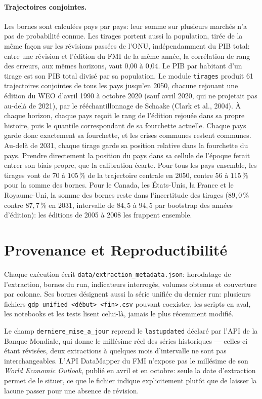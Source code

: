 \documentclass[11pt,a4paper]{article}
\begin{document}
\paragraph{Trajectoires conjointes.} Les bornes sont calculées pays par pays: leur somme sur plusieurs marchés n'a pas de probabilité connue. Les tirages portent aussi la population, tirée de la même façon sur les révisions passées de l'ONU, indépendamment du PIB total: entre une révision et l'édition du FMI de la même année, la corrélation de rang des erreurs, aux mêmes horizons, vaut 0,00 à 0,04. Le PIB par habitant d'un tirage est son PIB total divisé par sa population. Le module \texttt{tirages} produit 61 trajectoires conjointes de tous les pays jusqu'en 2050, chacune rejouant une édition du WEO d'avril 1990 à octobre 2020 (sauf avril 2020, qui ne projetait pas au-delà de 2021), par le rééchantillonnage de Schaake (Clark et al., 2004). À chaque horizon, chaque pays reçoit le rang de l'édition rejouée dans sa propre histoire, puis le quantile correspondant de sa fourchette actuelle. Chaque pays garde donc exactement sa fourchette, et les crises communes restent communes. Au-delà de 2031, chaque tirage garde sa position relative dans la fourchette du pays. Prendre directement la position du pays dans sa cellule de l'époque ferait entrer son biais propre, que la calibration écarte. Pour tous les pays ensemble, les tirages vont de $70$ à $105\,\%$ de la trajectoire centrale en 2050, contre $56$ à $115\,\%$ pour la somme des bornes. Pour le Canada, les États-Unis, la France et le Royaume-Uni, la somme des bornes reste dans l'incertitude des tirages ($89{,}0\,\%$ contre $87{,}7\,\%$ en 2031, intervalle de $84{,}5$ à $94{,}5$ par bootstrap des années d'édition): les éditions de 2005 à 2008 les frappent ensemble.

\section{Provenance et Reproductibilité}

Chaque exécution écrit \texttt{data/extraction\_metadata.json}: horodatage de l'extraction, bornes du run, indicateurs interrogés, volumes obtenus et couverture par colonne. Ses bornes désignent aussi la série unifiée du dernier run: plusieurs fichiers \texttt{gdp\_unified\_<début>\_<fin>.csv} pouvant coexister, les scripts en aval, les notebooks et les tests lisent celui-là, jamais le plus récemment modifié.

Le champ \texttt{derniere\_mise\_a\_jour} reprend le \texttt{lastupdated} déclaré par l'API de la Banque Mondiale, qui donne le millésime réel des séries historiques --- celles-ci étant révisées, deux extractions à quelques mois d'intervalle ne sont pas interchangeables. L'API DataMapper du FMI n'expose pas le millésime de son \textit{World Economic Outlook}, publié en avril et en octobre: seule la date d'extraction permet de le situer, ce que le fichier indique explicitement plutôt que de laisser la lacune passer pour une absence de révision.
\end{document}
